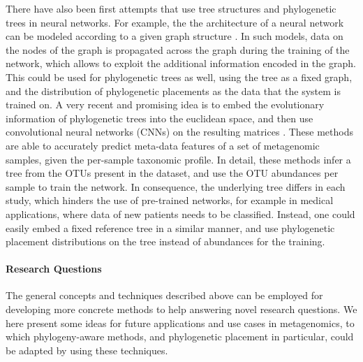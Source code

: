 There have also been first attempts that use tree structures and phylogenetic trees in neural networks.
For example, the the architecture of a neural network can be modeled
according to a given graph structure \cite{Scarselli2009,Bronstein2017}.
In such models, data on the nodes of the graph is propagated across the graph during the training of the network,
which allows to exploit the additional information encoded in the graph.
This could be used for phylogenetic trees as well, using the tree as a fixed graph,
and the distribution of phylogenetic placements as the data that the system is trained on.
A very recent and promising idea is to embed the evolutionary information of phylogenetic trees into the euclidean space,
and then use convolutional neural networks (CNNs) on the resulting matrices \cite{Fioravanti2018,Reiman2017,Reiman2018}.
These methods are able to accurately predict meta-data features of a set of metagenomic samples,
given the per-sample taxonomic profile.
In detail, these methods infer a tree from the OTUs present in the dataset,
and use the OTU abundances per sample to train the network.
In consequence, the underlying tree differs in each study, which hinders the use of pre-trained networks,
for example in medical applications, where data of new patients needs to be classified.
Instead, one could easily embed a fixed reference tree in a similar manner,
and use phylogenetic placement distributions on the tree instead of abundances for the training.

\paragraph{Research Questions}
\label{ch:ConclusionOutlook:par:ResearchQuestions}


The general concepts and techniques described above %
can be employed for developing more concrete methods to help answering novel research questions.
We here present some ideas for future applications and use cases in metagenomics,
to which phylogeny-aware methods, and phylogenetic placement in particular, could be adapted
by using these techniques.

